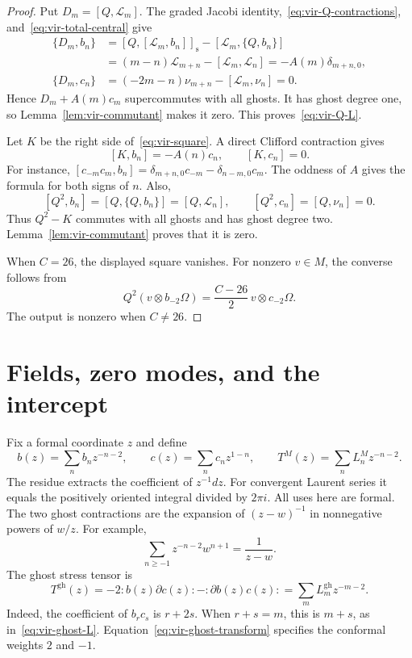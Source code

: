 \begin{proof}
Put $D_m=[Q,\mathcal L_m]$.
The graded Jacobi identity,~\eqref{eq:vir-Q-contractions}, and~\eqref{eq:vir-total-central} give
\begin{align*}
 \{D_m,b_n\}
 &=[Q,[\mathcal L_m,b_n]]_{\mathrm s}
   -[\mathcal L_m,\{Q,b_n\}]\\
 &=(m-n)\mathcal L_{m+n}-[\mathcal L_m,\mathcal L_n]
 =-A(m)\delta_{m+n,0},\\
 \{D_m,c_n\}
 &=(-2m-n)\nu_{m+n}-[\mathcal L_m,\nu_n]=0.
\end{align*}
Hence $D_m+A(m)c_m$ supercommutes with all ghosts.
It has ghost degree one, so Lemma~\ref{lem:vir-commutant} makes it zero.
This proves~\eqref{eq:vir-Q-L}.

Let $K$ be the right side of~\eqref{eq:vir-square}.
A direct Clifford contraction gives
\[
 [K,b_n]=-A(n)c_n,\qquad [K,c_n]=0.
\]
For instance,
$[c_{-m}c_m,b_n]=\delta_{m+n,0}c_{-m}-\delta_{n-m,0}c_m$.
The oddness of $A$ gives the formula for both signs of $n$.
Also,
\[
 [Q^2,b_n]=[Q,\{Q,b_n\}]=[Q,\mathcal L_n],\qquad
 [Q^2,c_n]=[Q,\nu_n]=0.
\]
Thus $Q^2-K$ commutes with all ghosts and has ghost degree two.
Lemma~\ref{lem:vir-commutant} proves that it is zero.

When $C=26$, the displayed square vanishes.
For nonzero $v\in M$, the converse follows from
\[
 Q^2(v\otimes b_{-2}\Omega)
 =\frac{C-26}{2}\,v\otimes c_{-2}\Omega.
\]
The output is nonzero when $C\neq26$.
\end{proof}

\section{Fields, zero modes, and the intercept}

Fix a formal coordinate $z$ and define
\[
 b(z)=\sum_n b_nz^{-n-2},\qquad
 c(z)=\sum_n c_nz^{1-n},\qquad
 T^M(z)=\sum_nL_n^Mz^{-n-2}.
\]
The residue extracts the coefficient of $z^{-1}dz$.
For convergent Laurent series it equals the positively oriented integral divided by $2\pi i$.
All uses here are formal.
The two ghost contractions are the expansion of $(z-w)^{-1}$ in nonnegative powers of $w/z$.
For example,
\[
 \sum_{n\geq-1}z^{-n-2}w^{n+1}=\frac1{z-w}.
\]
The ghost stress tensor is
\begin{equation}\label{eq:vir-stress-field}
 T^{\mathrm{gh}}(z)=-2:b(z)\partial c(z):-:\partial b(z)c(z):
 =\sum_mL_m^{\mathrm{gh}}z^{-m-2}.
\end{equation}
Indeed, the coefficient of $b_rc_s$ is $r+2s$.
When $r+s=m$, this is $m+s$, as in~\eqref{eq:vir-ghost-L}.
Equation~\eqref{eq:vir-ghost-transform} specifies the conformal weights $2$ and $-1$.

